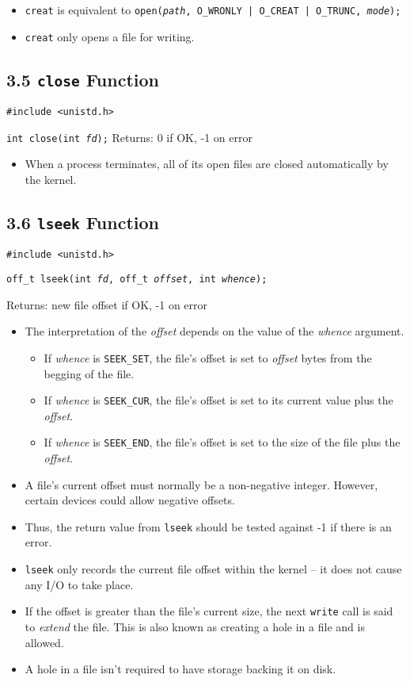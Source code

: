 \documentclass[]{article} \usepackage[all]{xy}
\newcommand{\code}{\texttt}
\begin{document}
\begin{itemize}
\item \code{creat} is equivalent to \code{open(\emph{path}, O\_WRONLY | O\_CREAT
| O\_TRUNC, \emph{mode});}
\item \code{creat} only opens a file for writing.
\end{itemize}

\subsection*{3.5 \code{close} Function}
\code{\#include <unistd.h>}

\code{int close(int \emph{fd});}
Returns: 0 if OK, -1 on error

\begin{itemize}
\item When a process terminates, all of its open files are closed automatically
by the kernel.
\end{itemize}

\subsection*{3.6 \code{lseek} Function}
\code{\#include <unistd.h>}

\code{off\_t lseek(int \emph{fd}, off\_t \emph{offset}, int \emph{whence});}

Returns: new file offset if OK, -1 on error

\begin{itemize}
\item The interpretation of the \emph{offset} depends on the value of the
\emph{whence} argument.
\begin{itemize}
\item If \emph{whence} is \code{SEEK\_SET}, the file's offset is set to
\emph{offset} bytes from the begging of the file.
\item If \emph{whence} is \code{SEEK\_CUR}, the file's offset is set to its
current value plus the \emph{offset}.
\item If \emph{whence} is \code{SEEK\_END}, the file's offset is set to the size
of the file plus the \emph{offset}.
\end{itemize}
\item A file's current offset must normally be a non-negative integer. However,
certain devices could allow negative offsets.
\item Thus, the return value from \code{lseek} should be tested against -1 if
there is an error.
\item \code{lseek} only records the current file offset within the kernel -- it
does not cause any I/O to take place.
\item If the offset is greater than the file's current size, the next
\code{write} call is said to \emph{extend} the file. This is also known as
creating a hole in a file and is allowed.
\item A hole in a file isn't required to have storage backing it on disk.
\end{itemize}
\end{document}
